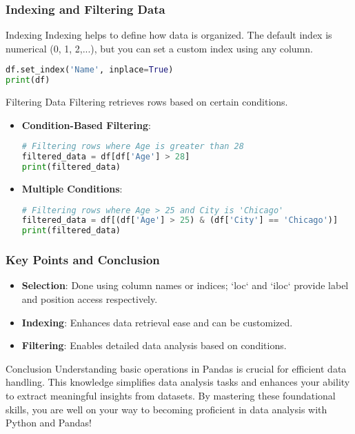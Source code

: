 \documentclass[aspectratio=169]{beamer}
\begin{document}
\begin{frame}[fragile]
    \frametitle{Indexing and Filtering Data}
    \begin{block}{Indexing}
        Indexing helps to define how data is organized. The default index is numerical (0, 1, 2,...), but you can set a custom index using any column.
        
        \begin{lstlisting}[language=Python]
df.set_index('Name', inplace=True)
print(df)
        \end{lstlisting}
    \end{block}

    \begin{block}{Filtering Data}
        Filtering retrieves rows based on certain conditions.
        
        \begin{itemize}
            \item \textbf{Condition-Based Filtering}:
            \begin{lstlisting}[language=Python]
# Filtering rows where Age is greater than 28
filtered_data = df[df['Age'] > 28]
print(filtered_data)
            \end{lstlisting}
            \item \textbf{Multiple Conditions}:
            \begin{lstlisting}[language=Python]
# Filtering rows where Age > 25 and City is 'Chicago'
filtered_data = df[(df['Age'] > 25) & (df['City'] == 'Chicago')]
print(filtered_data)
            \end{lstlisting}
        \end{itemize}
    \end{block}
\end{frame}

\begin{frame}
    \frametitle{Key Points and Conclusion}
    \begin{itemize}
        \item \textbf{Selection}: Done using column names or indices; `loc` and `iloc` provide label and position access respectively.
        \item \textbf{Indexing}: Enhances data retrieval ease and can be customized.
        \item \textbf{Filtering}: Enables detailed data analysis based on conditions.
    \end{itemize}

    \begin{block}{Conclusion}
        Understanding basic operations in Pandas is crucial for efficient data handling. This knowledge simplifies data analysis tasks and enhances your ability to extract meaningful insights from datasets. By mastering these foundational skills, you are well on your way to becoming proficient in data analysis with Python and Pandas!
    \end{block}
\end{frame}
\end{document}

